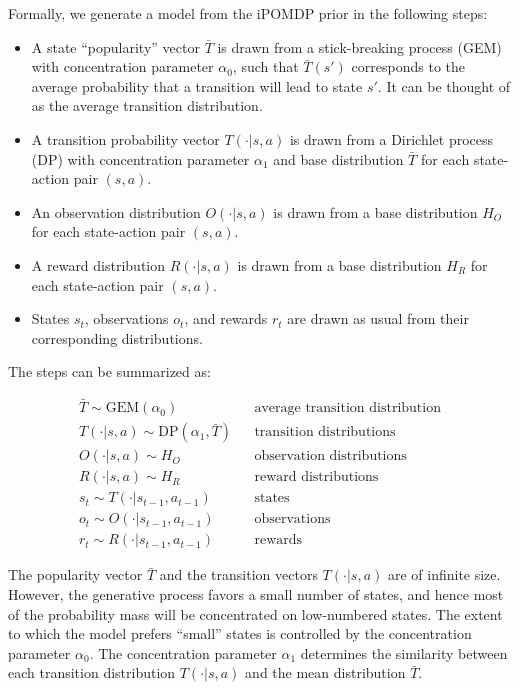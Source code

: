 \documentclass[11pt]{article}
\begin{document}
Formally, we generate a model from the iPOMDP prior in the following steps: 

\begin{itemize}
\item A state ``popularity'' vector $\bar{T}$ is drawn from a stick-breaking process (GEM) \cite{Teh2006} with concentration parameter $\alpha_0$, such that $\bar{T}(s')$ corresponds to the average probability that a transition will lead to state $s'$. It can be thought of as the average transition distribution.
\item A transition probability vector $T(\cdot | s,a)$ is drawn from a Dirichlet process (DP) \cite{Teh2006} with concentration parameter $\alpha_1$ and base distribution $\bar{T}$ for each state-action pair $(s,a)$.
\item An observation distribution $O(\cdot|s,a)$ is drawn from a base distribution $H_O$ for each state-action pair $(s,a)$.
\item A reward distribution $R(\cdot|s,a)$ is drawn from a base distribution $H_R$ for each state-action pair $(s,a)$.
\item States $s_t$, observations $o_t$, and rewards $r_t$ are drawn as usual from their corresponding distributions.
\end{itemize}

The steps can be summarized as:

\begin{align*}
\bar{T} \sim \text{GEM}(\alpha_0)  		&& \text{average transition distribution} \\
T(\cdot | s,a) \sim \text{DP}(\alpha_1, \bar{T})		 && \text{transition distributions}\\
O(\cdot | s,a) \sim H_O 				&& \text{observation distributions}\\
R(\cdot | s,a) \sim H_R 				&& \text{reward distributions}\\
s_t \sim T(\cdot | s_{t-1},a_{t-1}) 		&& \text{states}\\
o_t \sim O(\cdot | s_{t-1}, a_{t-1})		&& \text{observations} \\
r_t \sim R(\cdot | s_{t-1}, a_{t-1})		&& \text{rewards} 
\end{align*}

The popularity vector $\bar{T}$ and the transition vectors $T(\cdot | s,a)$ are of infinite size. However, the generative process favors a small number of states, and hence most of the probability mass will be concentrated on low-numbered states. The extent to which the model prefers ``small'' states is controlled by the concentration parameter $\alpha_0$. The concentration parameter $\alpha_1$ determines the similarity between each transition distribution $T(\cdot | s,a)$ and the mean distribution $\bar{T}$. 
\end{document}
